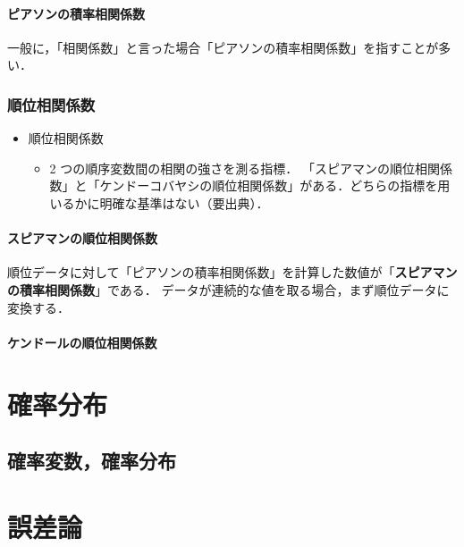 \subsubsection{ピアソンの積率相関係数}

一般に，「相関係数」と言った場合「ピアソンの積率相関係数」を指すことが多い．

\subsection{順位相関係数}

\begin{itemize}
  \item 順位相関係数
        \begin{itemize}
          \item 2 つの順序変数間の相関の強さを測る指標．
                「スピアマンの順位相関係数」と「ケンドーコバヤシの順位相関係数」がある．どちらの指標を用いるかに明確な基準はない（要出典）．
        \end{itemize}
\end{itemize}

\subsubsection{スピアマンの順位相関係数}

順位データに対して「ピアソンの積率相関係数」を計算した数値が「\textbf{スピアマンの積率相関係数}」である．
データが連続的な値を取る場合，まず順位データに変換する．

\subsubsection{ケンドールの順位相関係数}


\chapter{確率分布}

\section{確率変数，確率分布}


\chapter{誤差論}

